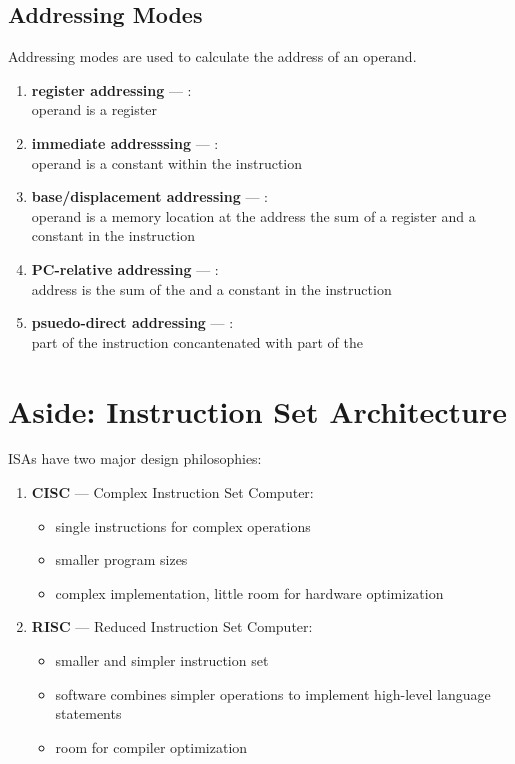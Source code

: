 \subsection{Addressing Modes}
Addressing modes are used to calculate the address of an operand.

\begin{enumerate}[itemsep=0.5em]
    \item \textbf{register addressing} --- : \\ operand is a register
    \item \textbf{immediate addresssing} --- : \\ operand is a constant within the instruction
    \item \textbf{base/displacement addressing} ---  : \\ operand is a memory location at the address the sum of a register and a constant in the instruction
    \item \textbf{PC-relative addressing} --- : \\ address is the sum of the  and a constant in the instruction
    \item \textbf{psuedo-direct addressing} --- : \\ part of the instruction concantenated with part of the 
\end{enumerate}


\section{Aside: Instruction Set Architecture}
ISAs have two major design philosophies:

\begin{enumerate}[itemsep=0.5em]
    \item \textbf{CISC} --- Complex Instruction Set Computer:\vspace{0.3em}
    \begin{itemize}
        \item single instructions for complex operations
        \item smaller program sizes
        \item complex implementation, little room for hardware optimization
    \end{itemize}
    \item \textbf{RISC} --- Reduced Instruction Set Computer:\vspace{0.3em}
    \begin{itemize}
        \item smaller and simpler instruction set
        \item software combines simpler operations to implement high-level language statements
        \item room for compiler optimization
    \end{itemize}
\end{enumerate}

